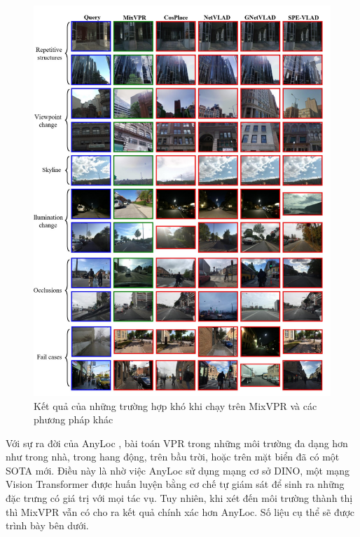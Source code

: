 \begin{figure}[H]
  \centering
  \includegraphics[width=\textwidth]{pics/Proposal/fail.png}
  \caption{Kết quả của những trường hợp khó khi chạy trên MixVPR và các phương pháp khác \cite{alibey2023mixvpr}}
\end{figure}

Với sự ra đời của AnyLoc \cite{keetha2023anyloc}, bài toán VPR trong những môi trường đa dạng hơn như trong nhà, trong hang động, trên bầu trời, hoặc trên mặt biển đã có một SOTA mới. Điều này là nhờ việc AnyLoc sử dụng mạng cơ sở DINO, một mạng Vision Transformer được huấn luyện bằng cơ chế tự giám sát để sinh ra những đặc trưng có giá trị với mọi tác vụ. Tuy nhiên, khi xét đến môi trường thành thị thì MixVPR vẫn có cho ra kết quả chính xác hơn AnyLoc. Số liệu cụ thể sẽ được trình bày bên dưới.

